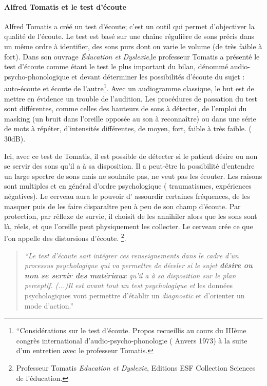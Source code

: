 \paragraph{Alfred Tomatis et le test d'écoute}
  Alfred Tomatis a créé un test d'écoute; c'est un outil qui permet d'objectiver la qualité de l'écoute.
  Le test est  basé sur une chaîne régulière de sons précis dans un même ordre à identifier, des sons purs dont on varie le volume (de très faible à fort). Dans son ouvrage \emph{Éducation et Dyslexie},le professeur Tomatis
  a présenté le test d'écoute comme étant le test le plus important du
  bilan, dénommé audio-psycho-phonologique et devant déterminer les
  possibilités d'écoute du sujet : auto-écoute et écoute de
  l'autre\footnote{``Considérations sur le test d'écoute. Propos
  	recueillis au cours du IIIème congrès international
  	d'audio-psycho-phonologie ( Anvers 1973) à la suite d'un entretien
  	avec le professeur Tomatis.}. 
  Avec un audiogramme classique, le but est de mettre en évidence un trouble de l'audition. Les procédures de passation du test sont différentes, comme  celles des hauteurs de sons à détecter, de l'emploi du masking (un bruit dans l'oreille opposée
  au son à reconnaître) ou dans une série de
  mots
  à répéter, d'intensités différentes, de moyen,
  fort, faible à très faible. ( 30dB).
  
  Ici, avec ce test de Tomatis, il est possible de détecter si le patient désire ou non se servir des sons
  qu'il a à sa disposition. Il a peut-être la possibilité d'entendre un large spectre de
  sons mais ne souhaite pas, ne veut pas les écouter. Les raisons sont multiples et en général d'ordre psychologique ( traumatismes,
  expériences négatives). Le cerveau aura le
  pouvoir d' assourdir certaines fréquences, de les masquer puis de les faire disparaître peu à peu de
  son champ d'écoute. Par protection, par réflexe de survie, il choisit de les
  annihiler alors que les sons sont là, réels, et que  l'oreille peut physiquement les collecter. Le cerveau crée ce
  que l'on appelle des distorsions d'écoute. \footnote{Professeur
    Tomatis \emph{Education et Dyslexie},  Editions ESF
    Collection Sciences de l'éducation.}. %

\begin{quote}
\emph{``Le test d'écoute sait intégrer ces renseignements dans le
cadre d'un processus psychologique qui va permettre de déceler si
le sujet\textbf{ désire ou non se servir des matériaux }qu'il a à sa disposition
sur le plan perceptif. (...)Il est avant tout un test psychologique
et} les données psychologiques vont permettre d'établir un\emph{ diagnostic}
et d'orienter un mode d'action.''
\end{quote}

